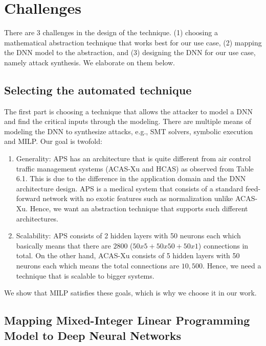 \section{Challenges}
There are 3 challenges in the design of the technique. 
(1) choosing a mathematical abstraction technique that works best for our use case, 
(2) mapping the \ac{DNN}  model to the abstraction, and 
(3) designing the \ac{DNN}  for our use case, namely attack synthesis. 
We elaborate on them below. 


\subsection{Selecting  the automated technique}
The first part is choosing a technique that allows the attacker to model a DNN and find the critical inputs through the modeling. 
There are multiple means of modeling the DNN to synthesize attacks, e.g., SMT solvers, symbolic execution and MILP.
Our goal is twofold: 
\begin{enumerate}
	\item Generality: \ac{APS} has an architecture that %
	is quite different from air control traffic management systems (\ac{ACAS-Xu} and \ac{HCAS}) as observed from Table 6.1.
	This is due to the difference in the application domain and the \ac{DNN} architecture design. 
	\ac{APS} is a medical system that consists of a standard feed-forward network with no exotic features such as normalization 
	unlike \ac{ACAS-Xu}. 
	Hence, we want an abstraction technique that supports such different architectures. 
	\item Scalability: \ac{APS} consists of 2 hidden layers with 50 neurons each which basically means that there are $2800$ ($50x5 + 50x50 + 50x1$) connections in total.
	On the other hand, \ac{ACAS-Xu} consists of 5 hidden layers with 50 neurons each which means the total connections are $10,500$. 
	Hence, we need a technique that is scalable to bigger systems. 
	
\end{enumerate}

 We show that \ac{MILP} satisfies these goals, which is why we choose it in our work. %


\subsection{ Mapping  Mixed-Integer Linear Programming Model to Deep Neural Networks}

